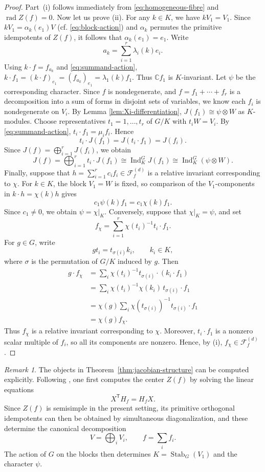 \documentclass[11pt,reqno]{amsart}
\numberwithin{equation}{section}
\theoremstyle{definition}
\theoremstyle{remark}
\newtheorem{remark}[theorem]{Remark}
\newcommand{\C}{\mathbb C}
\newcommand{\Ind}{\operatorname{Ind}}
\newcommand{\Stab}{\operatorname{Stab}}
\newcommand{\rad}{\operatorname{rad}}
\newcommand{\cF}{\mathcal F}
\begin{document}
\begin{proof}
Part~\textup{(i)} follows immediately from
\eqref{eq:homogeneous-fibre} and $\rad Z(f)=0$.    Now let us prove  \textup{(ii)}. For any $k\in K$, we have $kV_1=V_1$.  Since $kV_1=\alpha_k(e_1)V$ (cf. \eqref{eq:block-action}) 
 and $\alpha_k$ permutes the primitive idempotents of $Z(f)$, it
follows that $\alpha_k(e_1)=e_1$.  Write
\[
  a_k=\sum_{i=1}^r\lambda_i(k)e_i.
\]
Using $k\cdot f=f_{a_k}$ and \eqref{eq:summand-action}, $k\cdot f_1
  =
  (k\cdot f)_{e_1}
  =
  (f_{a_k})_{e_1}
  =
  \lambda_1(k)f_1$. Thus $\C f_1$ is $K$-invariant. Let $\psi$ be the corresponding
character. Since  $f$ is nondegenerate, and $f=f_1+\cdots +f_r$ is a decomposition into a sum of forms in disjoint sets of variables, we know each $f_i$ is nondegenerate on $V_i$. By Lemma \ref{lem:Xi-differentiation}, $J(f_1)\cong\psi\otimes W$ as $K$-modules. Choose representatives $t_1=1,\ldots,t_r$ of $G/K$ with
$t_iW=V_i$.  By \eqref{eq:summand-action}, $t_i\cdot f_1=\mu_i f_i$. Hence
\[
  t_i\cdot J(f_1)
  =
  J(t_i\cdot f_1)
  =
  J(f_i).
\]
Since $J(f)=\bigoplus_{i=1}^rJ(f_i)$, we obtain
\[
  J(f)
  =
  \bigoplus_{i=1}^r t_i\cdot J(f_1)
  \cong
  \Ind_K^G J(f_1)
  \cong
  \Ind_K^G(\psi\otimes W).
\]
Finally, suppose that $h=\sum_{i=1}^r c_i f_i\in\cF_f^{(d)}$ is a relative invariant corresponding to $\chi$.  For $k\in K$, the block $V_1=W$ is fixed, so
comparison of the $V_1$-components in  $k\cdot h=\chi(k)h$ gives
\[
  c_1\psi(k)f_1=c_1\chi(k)f_1.
\]
Since $c_1\ne0$, we obtain $\psi=\chi|_K$. Conversely, suppose that $\chi|_K=\psi$, and set
\[
  f_\chi
  =
  \sum_{i=1}^r
  \chi(t_i)^{-1}t_i\cdot f_1.
\]
For $g\in G$, write
\[
  gt_i=t_{\sigma(i)}k_i,
  \qquad k_i\in K,
\]
where $\sigma$ is the permutation of $G/K$ induced by $g$.  Then
\[
\begin{aligned}
  g\cdot f_\chi
  &=
  \sum_i
  \chi(t_i)^{-1}t_{\sigma(i)}
  \cdot(k_i\cdot f_1)\\
  &=
  \sum_i
  \chi(t_i)^{-1}\chi(k_i)\,
  t_{\sigma(i)}\cdot f_1\\
  &=
  \chi(g)
  \sum_i
  \chi(t_{\sigma(i)})^{-1}
  t_{\sigma(i)}\cdot f_1\\
  &=
  \chi(g)f_\chi.
\end{aligned}
\]
Thus $f_\chi$ is a relative invariant corresponding to $\chi$.  Moreover,
$t_i\cdot f_1$ is a nonzero scalar multiple of $f_i$,
so all its components are nonzero.  Hence, by
\textup{(i)}, $f_\chi\in\cF_f^{(d)}$.
\end{proof}


\begin{remark}\label{rem:computability}
The objects in Theorem~\ref{thm:jacobian-structure} can be computed
explicitly.  Following \cite[Algorithm~3.12]{HLYZ}, one first computes
the center $Z(f)$ by solving the linear equations
\[
  X^{\mathsf T}H_f=H_fX.
\]
Since $Z(f)$ is semisimple in the present setting, its primitive
orthogonal idempotents can then be obtained by simultaneous
diagonalization, and these determine the canonical decomposition
\[
  V=\bigoplus_i V_i,\qquad f=\sum_i f_i.
\]
The action of $G$ on the
blocks then determines $K=\Stab_G(V_1)$ and the character $\psi$.
\end{remark}
\end{document}
